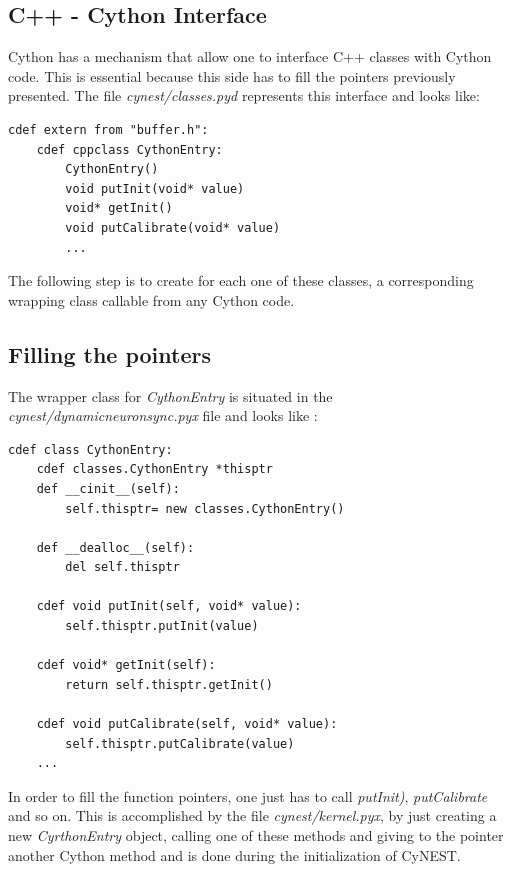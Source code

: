 \documentclass{article}
\begin{document}
\subsection{C++ - Cython Interface}
Cython has a mechanism that allow one to interface C++ classes with Cython code. This is essential because this side has to fill the pointers previously presented.
The file \emph{cynest/classes.pyd} represents this interface and looks like:
\begin{verbatim}
cdef extern from "buffer.h":
    cdef cppclass CythonEntry:
        CythonEntry()
        void putInit(void* value)
        void* getInit()
        void putCalibrate(void* value)
        ...
\end{verbatim}
The following step is to create for each one of these classes, a corresponding wrapping class callable from any Cython code.
\subsection{Filling the pointers}
The wrapper class for \emph{CythonEntry} is situated in the \emph{cynest/dynamicneuronsync.pyx} file and looks like :
\begin{verbatim}
cdef class CythonEntry:
    cdef classes.CythonEntry *thisptr
    def __cinit__(self):
        self.thisptr= new classes.CythonEntry()
        
    def __dealloc__(self):
        del self.thisptr

    cdef void putInit(self, void* value):
        self.thisptr.putInit(value)
    
    cdef void* getInit(self):
        return self.thisptr.getInit()

    cdef void putCalibrate(self, void* value):
        self.thisptr.putCalibrate(value)
    ...
\end{verbatim}
In order to fill the function pointers, one just has to call \emph{putInit)}, \emph{putCalibrate} and so on. This is accomplished by the file \emph{cynest/kernel.pyx}, by just creating a new \emph{CyrthonEntry} object, calling one of these methods and giving to the pointer another Cython method and is done during the initialization of CyNEST.
\end{document}
